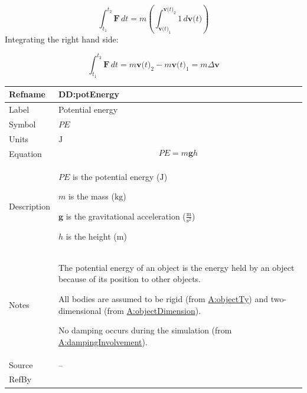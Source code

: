 \documentclass[12pt]{article}
\begin{document}
\begin{displaymath}
\int_{{t_{1}}}^{{t_{2}}}{\symbf{F}}\,dt=m \left(\int_{{\symbf{v}\text{(}t\text{)}_{1}}}^{{\symbf{v}\text{(}t\text{)}_{2}}}{1}\,d\symbf{v}\text{(}t\text{)}\right)
\end{displaymath}
Integrating the right hand side:

\begin{displaymath}
\int_{{t_{1}}}^{{t_{2}}}{\symbf{F}}\,dt=m {\symbf{v}\text{(}t\text{)}_{2}}-m {\symbf{v}\text{(}t\text{)}_{1}}=m Δ\symbf{v}
\end{displaymath}
\vspace{\baselineskip}
\noindent
\begin{minipage}{\textwidth}
\begin{tabular}{>{\raggedright}p{}>{\raggedright\arraybackslash}p{}}
\toprule \textbf{Refname} & \textbf{DD:potEnergy}
\label{DD:potEnergy}
\\ \midrule
Label & Potential energy
        
\\ \midrule
Symbol & $PE$
         
\\ \midrule
Units & ${\text{J}}$
        
\\ \midrule
Equation & \begin{displaymath}
           PE=m \symbf{g} h
           \end{displaymath}
\\ \midrule
Description & \begin{symbDescription}
              \item{$PE$ is the potential energy (${\text{J}}$)}
              \item{$m$ is the mass (${\text{kg}}$)}
              \item{$\symbf{g}$ is the gravitational acceleration ($\frac{\text{m}}{\text{s}^{2}}$)}
              \item{$h$ is the height (${\text{m}}$)}
              \end{symbDescription}
\\ \midrule
Notes & The potential energy of an object is the energy held by an object because of its position to other objects.
        
        All bodies are assumed to be rigid (from \hyperref[assumpOT]{A:objectTy}) and two-dimensional (from \hyperref[assumpOD]{A:objectDimension}).
        
        No damping occurs during the simulation (from \hyperref[assumpDI]{A:dampingInvolvement}).
        
\\ \midrule
Source & --
         
\\ \midrule
RefBy & 
\\ \bottomrule
\end{tabular}
\end{minipage}
\end{document}
